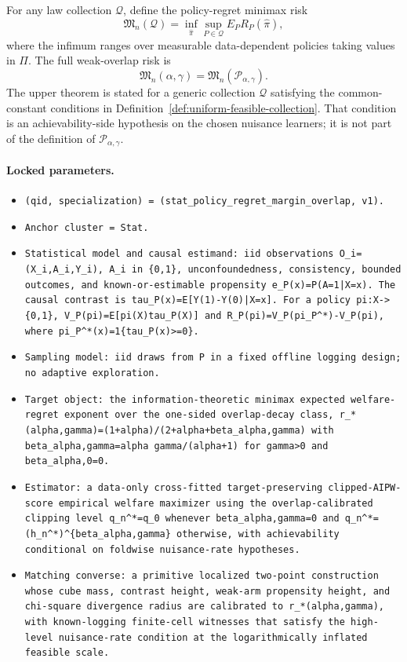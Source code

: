 \documentclass[11pt]{article}
\theoremstyle{definition}
\theoremstyle{plain}
\theoremstyle{remark}
\begin{document}
For any law collection \(\mathcal Q\), define the policy-regret minimax risk
\[
\mathfrak M_n(\mathcal Q)
=\inf_{\widehat\pi}
\sup_{P\in\mathcal Q}E_P R_P(\widehat\pi),
\]
where the infimum ranges over measurable data-dependent policies taking
values in \(\Pi\).  The full weak-overlap risk is
\[
\mathfrak M_n(\alpha,\gamma)=\mathfrak M_n(\mathcal P_{\alpha,\gamma}).
\]
The upper theorem is stated for a generic collection \(\mathcal Q\) satisfying
the common-constant conditions in Definition~\ref{def:uniform-feasible-collection}.
That condition is an achievability-side hypothesis on the chosen nuisance
learners; it is not part of the definition of \(\mathcal P_{\alpha,\gamma}\).

\paragraph{Locked parameters.}
\begin{itemize}[leftmargin=*]
  \item \texttt{(qid, specialization) = (stat\_policy\_regret\_margin\_overlap, v1).}
  \item \texttt{Anchor cluster = Stat.}
  \item \texttt{Statistical model and causal estimand: iid observations O\_i=(X\_i,A\_i,Y\_i), A\_i in \{0,1\}, unconfoundedness, consistency, bounded outcomes, and known-or-estimable propensity e\_P(x)=P(A=1|X=x). The causal contrast is tau\_P(x)=E[Y(1)-Y(0)|X=x]. For a policy pi:X->\{0,1\}, V\_P(pi)=E[pi(X)tau\_P(X)] and R\_P(pi)=V\_P(pi\_P\textasciicircum{}*)-V\_P(pi), where pi\_P\textasciicircum{}*(x)=1\{tau\_P(x)>=0\}.}
  \item \texttt{Sampling model: iid draws from P in a fixed offline logging design; no adaptive exploration.}
  \item \texttt{Target object: the information-theoretic minimax expected welfare-regret exponent over the one-sided overlap-decay class, r\_*(alpha,gamma)=(1+alpha)/(2+alpha+beta\_{alpha,gamma}) with beta\_{alpha,gamma}=alpha gamma/(alpha+1) for gamma>0 and beta\_{alpha,0}=0.}
  \item \texttt{Estimator: a data-only cross-fitted target-preserving clipped-AIPW-score empirical welfare maximizer using the overlap-calibrated clipping level q\_n\textasciicircum{}*=q\_0 whenever beta\_{alpha,gamma}=0 and q\_n\textasciicircum{}*=(h\_n\textasciicircum{}*)\textasciicircum{}\{beta\_{alpha,gamma}\} otherwise, with achievability conditional on foldwise nuisance-rate hypotheses.}
  \item \texttt{Matching converse: a primitive localized two-point construction whose cube mass, contrast height, weak-arm propensity height, and chi-square divergence radius are calibrated to r\_*(alpha,gamma), with known-logging finite-cell witnesses that satisfy the high-level nuisance-rate condition at the logarithmically inflated feasible scale.}
\end{itemize}
\end{document}
